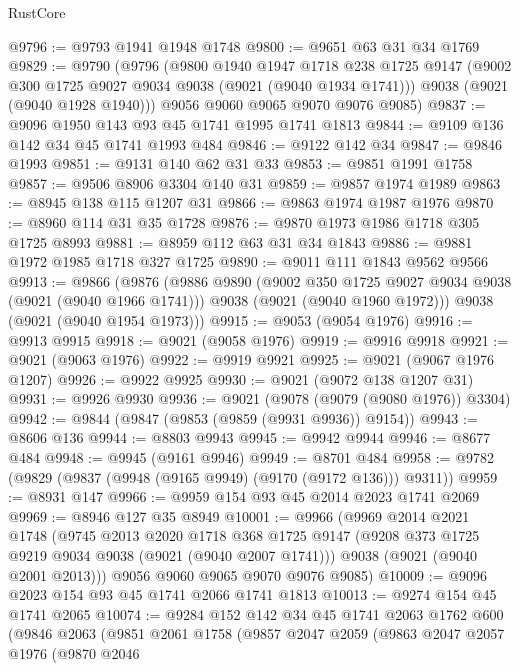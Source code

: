 \begin{lexlean}{RustCore}
\begin{coremodule}
@9796 := @9793 @1941 @1948 @1748
@9800 := @9651 @63 @31 @34 @1769
@9829 := @9790
    (@9796
      (@9800
        @1940
        @1947
        @1718
        @238
        @1725
        @9147
        (@9002 @300 @1725 @9027 @9034 @9038 (@9021 (@9040 @1934 @1741)))
        @9038
        (@9021 (@9040 @1928 @1940)))
      @9056
      @9060
      @9065
      @9070
      @9076
      @9085)
@9837 := @9096 @1950 @143 @93 @45 @1741 @1995 @1741 @1813
@9844 := @9109 @136 @142 @34 @45 @1741 @1993 @484
@9846 := @9122 @142 @34
@9847 := @9846 @1993
@9851 := @9131 @140 @62 @31 @33
@9853 := @9851 @1991 @1758
@9857 := @9506 @8906 @3304 @140 @31
@9859 := @9857 @1974 @1989
@9863 := @8945 @138 @115 @1207 @31
@9866 := @9863 @1974 @1987 @1976
@9870 := @8960 @114 @31 @35 @1728
@9876 := @9870 @1973 @1986 @1718 @305 @1725 @8993
@9881 := @8959 @112 @63 @31 @34 @1843
@9886 := @9881 @1972 @1985 @1718 @327 @1725
@9890 := @9011 @111 @1843 @9562 @9566
@9913 := @9866
    (@9876
      (@9886
        @9890
        (@9002 @350 @1725 @9027 @9034 @9038 (@9021 (@9040 @1966 @1741)))
        @9038
        (@9021 (@9040 @1960 @1972)))
      @9038
      (@9021 (@9040 @1954 @1973)))
@9915 := @9053 (@9054 @1976)
@9916 := @9913 @9915
@9918 := @9021 (@9058 @1976)
@9919 := @9916 @9918
@9921 := @9021 (@9063 @1976)
@9922 := @9919 @9921
@9925 := @9021 (@9067 @1976 @1207)
@9926 := @9922 @9925
@9930 := @9021 (@9072 @138 @1207 @31)
@9931 := @9926 @9930
@9936 := @9021 (@9078 (@9079 (@9080 @1976)) @3304)
@9942 := @9844 (@9847 (@9853 (@9859 (@9931 @9936)) @9154))
@9943 := @8606 @136
@9944 := @8803 @9943
@9945 := @9942 @9944
@9946 := @8677 @484
@9948 := @9945 (@9161 @9946)
@9949 := @8701 @484
@9958 := @9782 (@9829 (@9837 (@9948 (@9165 @9949) (@9170 (@9172 @136))) @9311))
@9959 := @8931 @147
@9966 := @9959 @154 @93 @45 @2014 @2023 @1741 @2069
@9969 := @8946 @127 @35 @8949
@10001 := @9966
    (@9969
      @2014
      @2021
      @1748
      (@9745
        @2013
        @2020
        @1718
        @368
        @1725
        @9147
        (@9208 @373 @1725 @9219 @9034 @9038 (@9021 (@9040 @2007 @1741)))
        @9038
        (@9021 (@9040 @2001 @2013)))
      @9056
      @9060
      @9065
      @9070
      @9076
      @9085)
@10009 := @9096 @2023 @154 @93 @45 @1741 @2066 @1741 @1813
@10013 := @9274 @154 @45 @1741 @2065
@10074 := @9284
    @152
    @142
    @34
    @45
    @1741
    @2063
    @1762
    @600
    (@9846
      @2063
      (@9851
        @2061
        @1758
        (@9857
          @2047
          @2059
          (@9863
            @2047
            @2057
            @1976
            (@9870
              @2046

\end{coremodule}
\end{lexlean}
